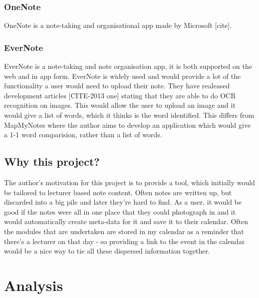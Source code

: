 \subsubsection{OneNote}
OneNote is a note-taking and organisational app made by Microsoft [cite].
\subsubsection{EverNote}
EverNote is a note-taking and note organisation app, it is both supported on the web and in app form. EverNote is widely used and would provide a lot of the functionality a user would need to upload their note. They have realeased development articles [CITE-2013 one] stating that they are able to do OCR recognition on images. This would allow the user to upload an image and it would give a list of words, which it thinks is the word identified. This differs from MapMyNotes where the author aims to develop an application which would give a 1-1 word comparision, rather than a list of words.


\subsection{Why this project?}
The author's motivation for this project is to provide a tool, which initially would be tailored to lecturer based note content. Often notes are written up, but discarded into a big pile and later they're hard to find. As a user, it would be good if the notes were all in one place that they could photograph in and it would automatically create meta-data for it and save it to their calendar. Often the modules that are undertaken are stored in my calendar as a reminder that there's a lecturer on that day - so providing a link to the event in the calendar would be a nice way to tie all these dispersed information together.

\section{Analysis}


